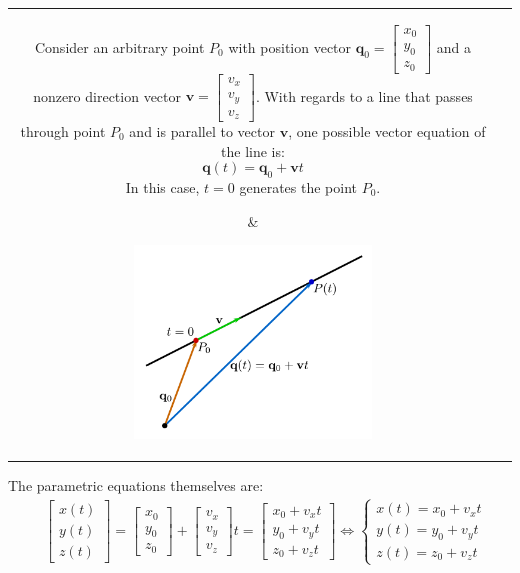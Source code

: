 \documentclass{article}
\begin{document}
\begin{tabular}{cc}
\parbox{0.5\textwidth}{
Consider an arbitrary point \(P_0\) with position vector \(\mathbf{q}_0 = \begin{bmatrix} x_0 \\ y_0 \\ z_0 \end{bmatrix}\) and a nonzero direction vector \(\mathbf{v} = \begin{bmatrix} v_x \\ v_y \\ v_z \end{bmatrix}\). With regards to a line that passes through point \(P_0\) and is parallel to vector \(\mathbf{v}\), one possible vector equation of the line is:
\[\mathbf{q}(t) = \mathbf{q}_0 + \mathbf{v}t\]
In this case, \(t = 0\) generates the point \(P_0\). 
} & \parbox{0.5\textwidth}{
\includegraphics[width = 0.5\textwidth]{vector_equation_line}
}
\end{tabular}
The parametric equations themselves are:
\begin{align*}
& \begin{bmatrix} x(t) \\ y(t) \\ z(t) \end{bmatrix} = \begin{bmatrix} x_0 \\ y_0 \\ z_0 \end{bmatrix} + \begin{bmatrix} v_x \\ v_y \\ v_z \end{bmatrix}t = \begin{bmatrix} x_0 + v_x t \\ y_0 + v_y t \\ z_0 + v_z t \end{bmatrix} 
\iff \left\{\begin{array}{c} x(t) = x_0 + v_x t \\ y(t) = y_0 + v_y t \\ z(t) = z_0 + v_z t \end{array}\right.
\end{align*}
\end{document}
